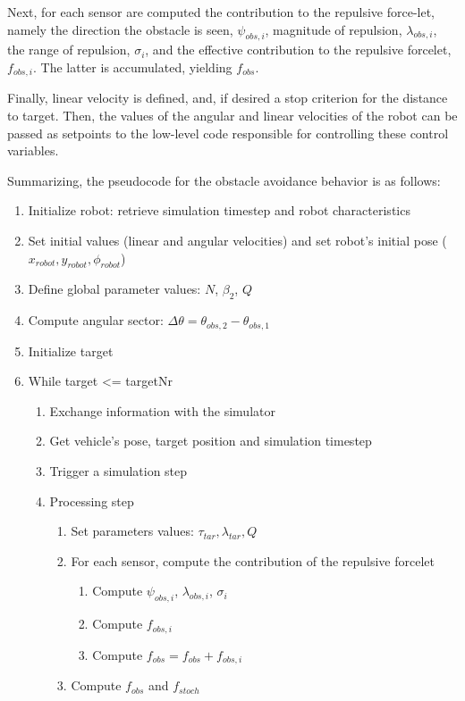 Next, for each sensor are computed the contribution to the repulsive force-let,
namely the direction the obstacle is seen, $\psi_{obs,i}$, magnitude of repulsion,
$\lambda_{obs,i}$, the range of repulsion, $\sigma_i$, and the effective
contribution to the repulsive forcelet, $f_{obs,i}$. The latter is accumulated,
yielding $f_{obs}$.

Finally, linear velocity is defined, and, if desired a stop criterion for the
distance to target. Then, the values of the angular and linear velocities of the
robot can be passed as setpoints to the low-level code responsible for
controlling these control variables.

Summarizing, the pseudocode for the obstacle avoidance behavior is as follows:
\begin{enumerate}
\item Initialize robot: retrieve simulation timestep and robot characteristics
\item Set initial values (linear and angular velocities) and set robot's initial
  pose ($x_{robot}, y_{robot}, \phi_{robot}$)
\item Define global parameter values: $N$, $\beta_2$, $Q$
\item Compute angular sector: $\Delta \theta = \theta_{obs,2} - \theta_{obs,1}$
\item Initialize target
\item While target <= targetNr
  \begin{enumerate}
  \item Exchange information with the simulator
  \item Get vehicle's pose, target position and simulation timestep
  \item Trigger a simulation step
  \item Processing step
    \begin{enumerate}
    \item Set parameters values: $\tau_{tar}, \lambda_{tar}, Q$
    \item For each sensor, compute the contribution of the repulsive forcelet
      \begin{enumerate}
      \item Compute $\psi_{obs,i}$, $\lambda_{obs,i}$, $\sigma_i$
      \item Compute $f_{obs,i}$
      \item Compute $f_{obs} = f_{obs} + f_{obs,i}$
      \end{enumerate}
    \item Compute $f_{obs}$ and $f_{stoch}$

\end{enumerate}
\end{enumerate}
\end{enumerate}
